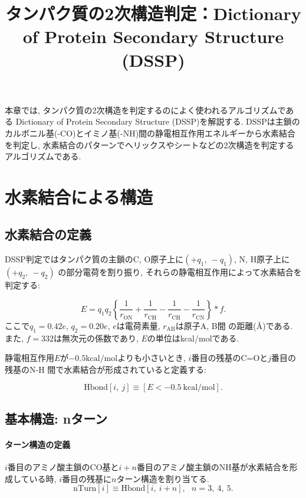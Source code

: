 





\title{タンパク質の2次構造判定：Dictionary of Protein Secondary Structure (DSSP)}
\maketitle

本章では, タンパク質の2次構造を判定するのによく使われるアルゴリズムである
Dictionary of Protein Secondary Structure (DSSP)\cite{Kabsch1983}を解説する.
DSSPは主鎖のカルボニル基(-CO)とイミノ基(-NH)間の静電相互作用エネルギーから水素結合を判定し,
水素結合のパターンでヘリックスやシートなどの2次構造を判定するアルゴリズムである.


\section{水素結合による構造}

\subsection{水素結合の定義}
DSSP判定ではタンパク質の主鎖のC, O原子上に$(+q_{1},~ -q_{1})$, N, H原子上に$(+q_{2},~ -q_{2})$
の部分電荷を割り振り, それらの静電相互作用によって水素結合を判定する:

\begin{equation}
 E = q_{1} q_{2}
     \left\{
              \frac{1}{r_{\mathrm{ON}}} + \frac{1}{r_{\mathrm{CH}}} 
            - \frac{1}{r_{\mathrm{CH}}} - \frac{1}{r_{\mathrm{CN}}} 
     \right\} * f .
\end{equation}
ここで$q_{1} = 0.42e$, $q_{2} = 0.20e$, $e$は電荷素量, $r_{\mathrm{AB}}$は原子A, B間
の距離(\AA)である. 
また, $f = 332$は無次元の係数であり, $E$の単位はkcal/molである.

静電相互作用$E$が$-0.5 \mathrm{kcal/mol}$よりも小さいとき, $i$番目の残基のC=Oと$j$番目の残基のN-H
間で水素結合が形成されていると定義する:

\begin{equation}
 \mathrm{H bond}[i,~ j]
 \equiv
 [E < -0.5 ~\mathrm{kcal/mol}] .
\end{equation}


\subsection{基本構造: nターン}
\paragraph{ターン構造の定義}
$i$番目のアミノ酸主鎖のCO基と$i+n$番目のアミノ酸主鎖のNH基が水素結合を形成している時, 
$i$番目の残基に$n$ターン構造を割り当てる.
\begin{equation}
 \mathrm{nTurn}[i]
 \equiv
 \mathrm{H bond}[i ,~ i  + n],
 ~~~
 n = 3,~ 4,~ 5.
\end{equation}

